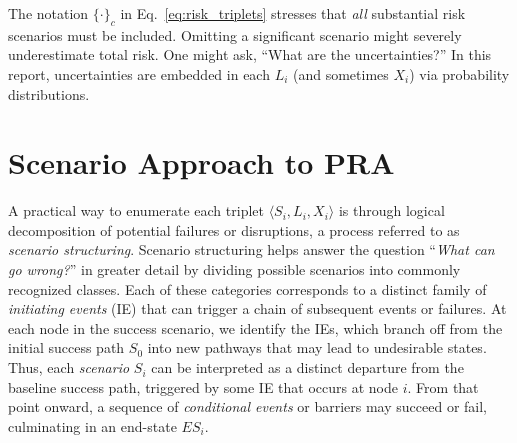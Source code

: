 The notation \(\{\cdot\}_{c}\) in Eq.~\eqref{eq:risk_triplets} stresses that \emph{all} substantial risk scenarios must be included. Omitting a significant scenario might severely underestimate total risk. One might ask, ``What are the uncertainties?'' In this report, uncertainties are embedded in each \(L_i\) (and sometimes \(X_i\)) via probability distributions.

\section{Scenario Approach to PRA}
\label{sec:scenario_approach_to_pra}

A practical way to enumerate each triplet \(\langle S_i, L_i, X_i\rangle\) is through logical decomposition of potential failures or disruptions, a process referred to as \emph{scenario structuring}. Scenario structuring helps answer the question ``\textit{What can go wrong?}'' in greater detail by dividing possible scenarios into commonly recognized classes. Each of these categories corresponds to a distinct family of \emph{initiating events} (IE) that can trigger a chain of subsequent events or failures. At each node in the success scenario, we identify the IEs, which branch off from the initial success path \(S_0\) into new pathways that may lead to undesirable states. Thus, each \emph{scenario} \(S_i\) can be interpreted as a distinct departure from the baseline success path, triggered by some IE that occurs at node \(i\). From that point onward, a sequence of \emph{conditional events} or barriers may succeed or fail, culminating in an end-state \(ES_i\).
